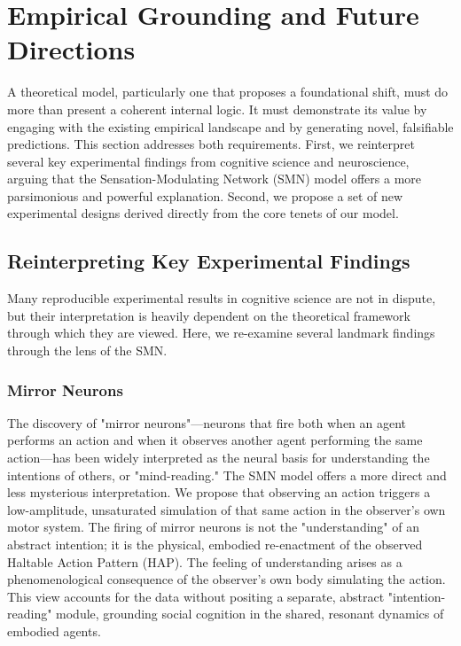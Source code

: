 \section{Empirical Grounding and Future Directions}
\label{sec:empirical}
A theoretical model, particularly one that proposes a foundational shift, must do more than present a coherent internal logic. It must demonstrate its value by engaging with the existing empirical landscape and by generating novel, falsifiable predictions. This section addresses both requirements. First, we reinterpret several key experimental findings from cognitive science and neuroscience, arguing that the Sensation-Modulating Network (SMN) model offers a more parsimonious and powerful explanation. Second, we propose a set of new experimental designs derived directly from the core tenets of our model.

\subsection{Reinterpreting Key Experimental Findings}
\label{subsec:reinterpreting}
Many reproducible experimental results in cognitive science are not in dispute, but their interpretation is heavily dependent on the theoretical framework through which they are viewed. Here, we re-examine several landmark findings through the lens of the SMN.

\subsubsection{Mirror Neurons}
\label{ssubsec:mirror_neurons}
The discovery of "mirror neurons"—neurons that fire both when an agent performs an action and when it observes another agent performing the same action—has been widely interpreted as the neural basis for understanding the intentions of others, or "mind-reading." The SMN model offers a more direct and less mysterious interpretation. We propose that observing an action triggers a low-amplitude, unsaturated simulation of that same action in the observer's own motor system. The firing of mirror neurons is not the "understanding" of an abstract intention; it is the physical, embodied re-enactment of the observed Haltable Action Pattern (HAP). The feeling of understanding arises as a phenomenological consequence of the observer's own body simulating the action. This view accounts for the data without positing a separate, abstract "intention-reading" module, grounding social cognition in the shared, resonant dynamics of embodied agents.

